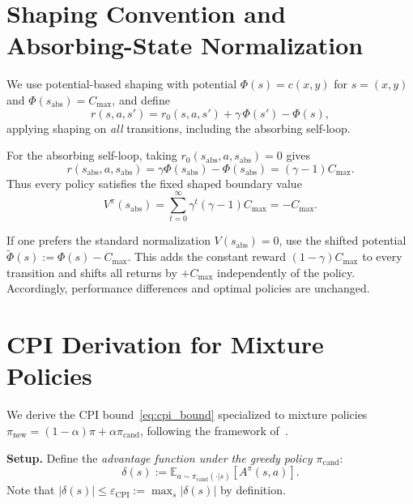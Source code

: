 \documentclass{article}
\theoremstyle{plain}
\theoremstyle{definition}
\theoremstyle{remark}
\newcommand{\E}{\mathbb{E}}
\begin{document}
\section{Shaping Convention and Absorbing-State Normalization}
\label{app:shaping_convention}

We use potential-based shaping with potential $\Phi(s)=c(x,y)$ for $s=(x,y)$ and $\Phi(s_{\mathrm{abs}})=C_{\max}$, and define
\begin{equation}
r(s,a,s')
=
r_0(s,a,s')
+
\gamma\,\Phi(s')-\Phi(s),
\end{equation}
applying shaping on \emph{all} transitions, including the absorbing self-loop.

For the absorbing self-loop, taking $r_0(s_{\mathrm{abs}},a,s_{\mathrm{abs}})=0$ gives
\[
r(s_{\mathrm{abs}},a,s_{\mathrm{abs}})
=
\gamma \Phi(s_{\mathrm{abs}})-\Phi(s_{\mathrm{abs}})
=
(\gamma-1)C_{\max}.
\]
Thus every policy satisfies the fixed shaped boundary value
\[
V^\pi(s_{\mathrm{abs}})
=
\sum_{t=0}^\infty \gamma^t (\gamma-1)C_{\max}
=
-C_{\max}.
\]

If one prefers the standard normalization $V(s_{\mathrm{abs}})=0$, use the shifted potential
$\tilde{\Phi}(s):=\Phi(s)-C_{\max}$.
This adds the constant reward $(1-\gamma)C_{\max}$ to every transition and shifts all returns by $+C_{\max}$ independently of the policy.
Accordingly, performance differences and optimal policies are unchanged.

\section{CPI Derivation for Mixture Policies}
\label{app:cpi_derivation}

We derive the CPI bound~\eqref{eq:cpi_bound} specialized to mixture policies $\pi_{\mathrm{new}} = (1-\alpha)\pi + \alpha\pi_{\mathrm{cand}}$, following the framework of~\citet{KakadeLangford2002}.

\textbf{Setup.}
Define the \emph{advantage function under the greedy policy $\pi_{\mathrm{cand}}$}:
\begin{equation}
\delta(s) := \E_{a \sim \pi_{\mathrm{cand}}(\cdot|s)}[A^\pi(s,a)].
\end{equation}
Note that $|\delta(s)| \le \varepsilon_{\mathrm{CPI}} := \max_s |\delta(s)|$ by definition.
\end{document}
